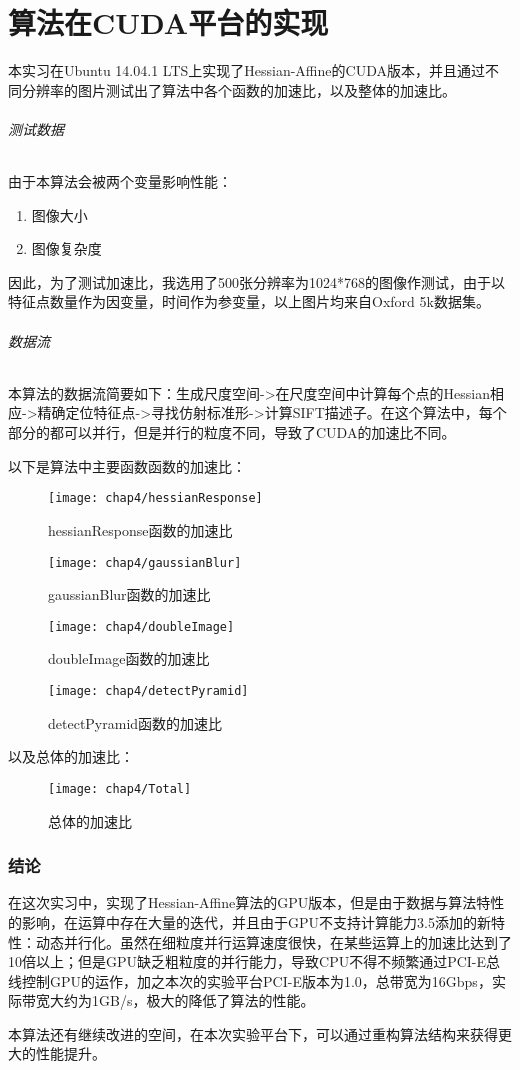 
\chapter{算法在CUDA平台的实现}
  本实习在Ubuntu 14.04.1 LTS上实现了Hessian-Affine的CUDA版本，并且通过不同分辨率的图片测试出了算法中各个函数的加速比，以及整体的加速比。
  \subparagraph{测试数据}
    由于本算法会被两个变量影响性能：
    \begin{enumerate}
      \item 图像大小
      \item 图像复杂度
    \end{enumerate}
    \par
    因此，为了测试加速比，我选用了500张分辨率为1024*768的图像作测试，由于以特征点数量作为因变量，时间作为参变量，以上图片均来自Oxford 5k数据集。
  \subparagraph{数据流}
    本算法的数据流简要如下：生成尺度空间->在尺度空间中计算每个点的Hessian相应->精确定位特征点->寻找仿射标准形->计算SIFT描述子。在这个算法中，每个部分的都可以并行，但是并行的粒度不同，导致了CUDA的加速比不同。
    \par
    以下是算法中主要函数函数的加速比：
    \begin{figure}[htp]
      \centering
      \texttt{[image: chap4/hessianResponse]}
      \caption{hessianResponse函数的加速比}
    \end{figure}
    \begin{figure}[htp]
      \centering
      \texttt{[image: chap4/gaussianBlur]}
      \caption{gaussianBlur函数的加速比}
    \end{figure}
    \begin{figure}[htp]
      \centering
      \texttt{[image: chap4/doubleImage]}
      \caption{doubleImage函数的加速比}
    \end{figure}
    \begin{figure}[htp]
      \centering
      \texttt{[image: chap4/detectPyramid]}
      \caption{detectPyramid函数的加速比}
    \end{figure}
    以及总体的加速比：
    \begin{figure}[htp]
      \centering
      \texttt{[image: chap4/Total]}
      \caption{总体的加速比}
    \end{figure}
  \subsection*{结论}
    在这次实习中，实现了Hessian-Affine算法的GPU版本，但是由于数据与算法特性的影响，在运算中存在大量的迭代，并且由于GPU不支持计算能力3.5添加的新特性：动态并行化。虽然在细粒度并行运算速度很快，在某些运算上的加速比达到了10倍以上；但是GPU缺乏粗粒度的并行能力，导致CPU不得不频繁通过PCI-E总线控制GPU的运作，加之本次的实验平台PCI-E版本为1.0，总带宽为16Gbps，实际带宽大约为1GB/s，极大的降低了算法的性能。
    \par
    本算法还有继续改进的空间，在本次实验平台下，可以通过重构算法结构来获得更大的性能提升。
